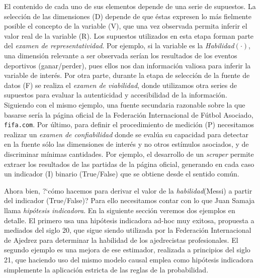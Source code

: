\documentclass[a4paper,11pt]{book}
\theoremstyle{definition}
\begin{document}
El contenido de cada uno de sus elementos depende de una serie de supuestos.
La selecci\'on de las dimensiones (D) depende de que \'estas expresen lo m\'as fielmente posible el concepto de la variable (V), que una vez observada permita inferir el valor real de la variable (R).
%
Los supuestos utilizados en esta etapa forman parte del \emph{examen de representatividad}.
%
Por ejemplo, si la variable es la \emph{Habilidad$(\cdot)$}, una dimensi\'on relevante a ser observada ser\'ian los resultados de los eventos deportivos (ganar/perder), pues ellos nos dan informaci\'on valiosa para inferir la variable de inter\'es.
%
Por otra parte, durante la etapa de selecci\'on de la fuente de datos (F) se realiza el \emph{examen de viabilidad}, donde utilizamos otra series de supuestos para evaluar la autenticidad y accesibilidad de la informaci\'on.
%
Siguiendo con el mismo ejemplo, una fuente secundaria razonable sobre la que basarse ser\'ia la p\'agina oficial de la Federaci\'on Internacional de F\'utbol Asociado, \texttt{fifa.com}.
%
Por \'ultimo, para definir el procedimiento de medici\'on (P) necesitamos realizar un \emph{examen de confiabilidad} donde se eval\'ua su capacidad para detectar en la fuente s\'olo las dimensiones de inter\'es y no otros est\'imulos asociados, y de discriminar m\'inimas cantidades.
%
Por ejemplo, el desarrollo de un \emph{scraper} permite extraer los resultados de las partidas de la p\'agina oficial, generando en cada caso un indicador (I) binario (True/False) que se obtiene desde el sentido com\'un.


Ahora bien, ?`c\'omo hacemos para derivar el valor de la \textit{habilidad}(Messi) a partir del indicador (True/False)?
%
Para ello necesitamos contar con lo que Juan Samaja llama \emph{hip\'otesis indicadora}.
%
%
En la siguiente secci\'on veremos dos ejemplos en detalle.
%
El primero usa una hip\'otesis indicadora ad-hoc muy exitosa, propuesta a mediados del siglo 20, que sigue siendo utilizada por la Federaci\'on Internacional de Ajedrez para determinar la habilidad de los ajedrecistas profesionales.
%
El segundo ejemplo es una mejora de ese estimador, realizada a principios del siglo 21, que haciendo uso del mismo modelo causal emplea como hip\'otesis indicadora simplemente la aplicaci\'on estricta de las reglas de la probabilidad.
\end{document}
